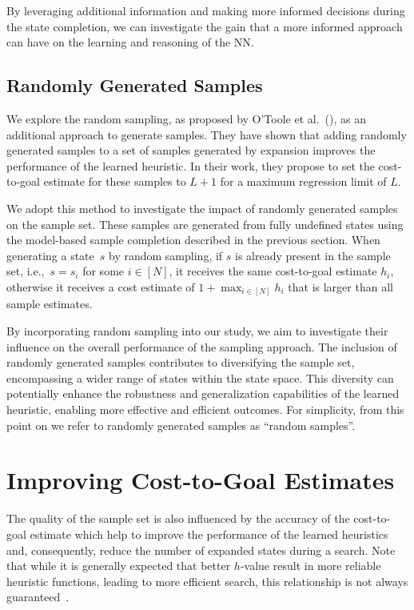 By leveraging additional information and making more informed decisions during the state completion, we can investigate the gain that a more informed approach can have on the learning and reasoning of the NN.

\subsection{Randomly Generated Samples}
\label{sec:random-samples-theory}

We explore the random sampling, as proposed by O'Toole et al.~(\citeyear{OToole/2022}), as an additional approach to generate samples. They have shown that adding randomly generated samples to a set of samples generated by expansion improves the performance of the learned heuristic. In their work, they propose to set the cost-to-goal estimate for these samples to $L+1$ for a maximum regression limit of $L$.

We adopt this method to investigate the impact of randomly generated samples on the sample set. These samples are generated from fully undefined states using the model-based sample completion described in the previous section. When generating a state~$s$ by random sampling, if $s$ is already present in the sample set, i.e.,~$s = s_i$ for some $i\in[N]$, it receives the same cost-to-goal estimate $h_i$, otherwise it receives a cost estimate of $1+\max_{i\in[N]} h_i$ that is larger than all sample estimates.

By incorporating random sampling into our study, we aim to investigate their influence on the overall performance of the sampling approach. The inclusion of randomly generated samples contributes to diversifying the sample set, encompassing a wider range of states within the state space. This diversity can potentially enhance the robustness and generalization capabilities of the learned heuristic, enabling more effective and efficient outcomes. For simplicity, from this point on we refer to randomly generated samples as ``random samples''.

\section{Improving Cost-to-Goal Estimates}
\label{sec:hvalue}

The quality of the sample set is also influenced by the accuracy of the cost-to-goal estimate which help to improve the performance of the learned heuristics and, consequently, reduce the number of expanded states during a search. Note that while it is generally expected that better $h$-value result in more reliable heuristic functions, leading to more efficient search, this relationship is not always guaranteed~\cite{Holte/2010}.

